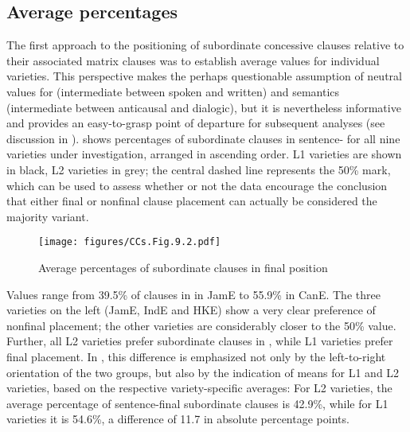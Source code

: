 \subsection{\label{bkm:Ref51143922}Average percentages}\label{sec:9.2.1}

The first approach to the positioning of subordinate concessive clauses relative to their associated matrix clauses was to establish average values for individual varieties. This perspective makes the perhaps questionable assumption of neutral values for  (intermediate between spoken and written) and semantics (intermediate between anticausal and dialogic), but it is nevertheless informative and provides an easy-to-grasp point of departure for subsequent analyses (see discussion in ).  shows percentages of subordinate clauses in sentence- for all nine varieties under investigation, arranged in ascending order. L1 varieties are shown in black, L2 varieties in grey; the central dashed line represents the 50\% mark, which can be used to assess whether or not the data encourage the conclusion that either final or nonfinal clause placement can actually be considered the majority variant.

\begin{figure}
\texttt{[image: figures/CCs.Fig.9.2.pdf]}
\caption{\label{bkm:Ref50750170}\label{fig:9.2}Average percentages of subordinate clauses in final position}
\end{figure}

Values range from 39.5\% of clauses in  in JamE to 55.9\% in CanE. The three varieties on the left (JamE, IndE and HKE) show a very clear preference of nonfinal placement; the other varieties are considerably closer to the 50\% value. Further, all L2 varieties prefer subordinate clauses in , while L1 varieties prefer final placement. In , this difference is emphasized not only by the left-to-right orientation of the two groups, but also by the indication of means for L1 and L2 varieties, based on the respective variety-specific averages: For L2 varieties, the average percentage of sentence-final subordinate clauses is 42.9\%, while for L1 varieties it is 54.6\%, a difference of 11.7 in absolute percentage points.\largerpage

